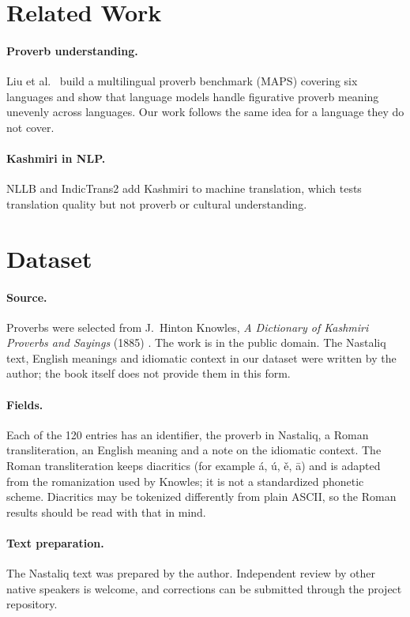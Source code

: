 \documentclass[11pt]{article}
\begin{document}
\section{Related Work}
\paragraph{Proverb understanding.} Liu et al.\ \cite{liu2024maps} build a multilingual proverb benchmark (MAPS) covering six languages and show that language models handle figurative proverb meaning unevenly across languages. Our work follows the same idea for a language they do not cover.
\paragraph{Kashmiri in NLP.} NLLB \cite{nllb2022} and IndicTrans2 \cite{gala2023indictrans2} add Kashmiri to machine translation, which tests translation quality but not proverb or cultural understanding.

\section{Dataset}
\paragraph{Source.} Proverbs were selected from J.~Hinton Knowles, \emph{A Dictionary of Kashmiri Proverbs and Sayings} (1885) \cite{knowles1885}. The work is in the public domain. The Nastaliq text, English meanings and idiomatic context in our dataset were written by the author; the book itself does not provide them in this form.

\paragraph{Fields.} Each of the 120 entries has an identifier, the proverb in Nastaliq, a Roman transliteration, an English meaning and a note on the idiomatic context. The Roman transliteration keeps diacritics (for example \'a, \'u, \v{e}, \=a) and is adapted from the romanization used by Knowles; it is not a standardized phonetic scheme. Diacritics may be tokenized differently from plain ASCII, so the Roman results should be read with that in mind.

\paragraph{Text preparation.} The Nastaliq text was prepared by the author. Independent review by other native speakers is welcome, and corrections can be submitted through the project repository.
\end{document}
